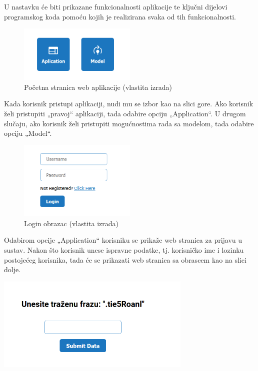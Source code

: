 \documentclass[]{foi}
\begin{document}
U nastavku će biti prikazane funkcionalnosti aplikacije te ključni dijelovi programskog koda pomoću kojih je realizirana svaka od tih funkcionalnosti.

\begin{figure}[!h]
    \centering
    \includegraphics[width=0.5\textwidth]{slike/app_pocetna.png}
    \caption{Početna stranica web aplikacije (vlastita izrada)}
    \label{fig:app-pocetna}
\end{figure}

Kada korisnik pristupi aplikaciji, nudi mu se izbor kao na slici gore. Ako korisnik želi pristupiti „pravoj“ aplikaciji, tada odabire opciju „Application“. U drugom slučaju, ako korisnik želi pristupiti mogućnostima rada sa modelom, tada odabire opciju „Model“.

\begin{figure}[!h]
    \centering
    \includegraphics[width=0.5\textwidth]{slike/app_login.png}
    \caption{Login obrazac (vlastita izrada)}
    \label{fig:app-login}
\end{figure}

Odabirom opcije „Application“ korisniku se prikaže web stranica za prijavu u sustav. Nakon što korisnik unese ispravne podatke, tj. korisničko ime i lozinku postojećeg korisnika, tada će se prikazati web stranica sa obrascem kao na slici dolje.

\begin{center}
    \includegraphics[width=0.7\textwidth]{slike/app_tipkanje_login.png}
    \label{fig:app-tipkanje-login}
\end{center}
\end{document}
